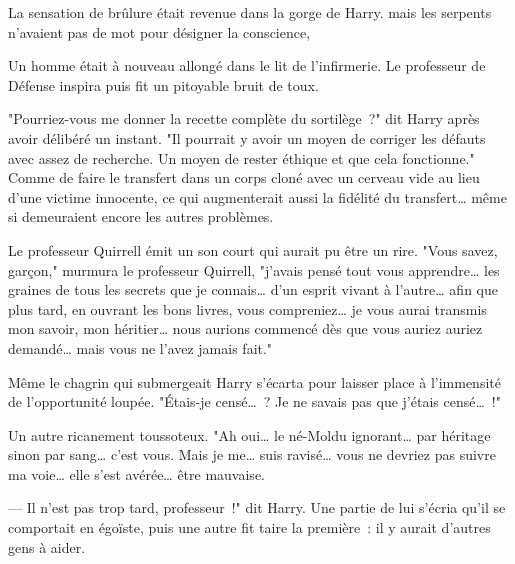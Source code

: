 La sensation de brûlure était revenue dans la gorge de Harry.  mais les serpents n'avaient pas de mot pour désigner la conscience, 


Un homme était à nouveau allongé dans le lit de l'infirmerie. Le professeur de Défense inspira puis fit un pitoyable bruit de toux.

"Pourriez-vous me donner la recette complète du sortilège~?" dit Harry après avoir délibéré un instant. "Il pourrait y avoir un moyen de corriger les défauts avec assez de recherche. Un moyen de rester éthique et que cela fonctionne." Comme de faire le transfert dans un corps cloné avec un cerveau vide au lieu d'une victime innocente, ce qui augmenterait aussi la fidélité du transfert… même si demeuraient encore les autres problèmes.

Le professeur Quirrell émit un son court qui aurait pu être un rire. "Vous savez, garçon," murmura le professeur Quirrell, "j'avais pensé tout vous apprendre… les graines de tous les secrets que je connais… d'un esprit vivant à l'autre… afin que plus tard, en ouvrant les bons livres, vous compreniez… je vous aurai transmis mon savoir, mon héritier… nous aurions commencé dès que vous auriez auriez demandé… mais vous ne l'avez jamais fait."

Même le chagrin qui submergeait Harry s'écarta pour laisser place à l'immensité de l'opportunité loupée. "Étais-je censé…~? Je ne savais pas que j'étais censé…~!"

Un autre ricanement toussoteux. "Ah oui… le né-Moldu ignorant… par héritage sinon par sang… c'est vous. Mais je me… suis ravisé… vous ne devriez pas suivre ma voie… elle s'est avérée… être mauvaise.

--- Il n'est pas trop tard, professeur~!" dit Harry. Une partie de lui s'écria qu'il se comportait en égoïste, puis une autre fit taire la première~: il y aurait d'autres gens à aider.

